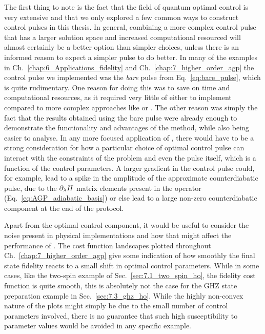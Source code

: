 The first thing to note is the fact that the field of quantum optimal control is very extensive and that we only explored a few common ways to construct control pulses in this thesis. In general, combining a more complex control pulse that has a larger solution space and increased computational resourced will almost certainly be a better option than simpler choices, unless there is an informed reason to expect a simpler pulse to do better. In many of the examples in Ch.~\ref{chap:6_Applications_fidelity} and Ch.~\ref{chap:7_higher_order_agp} the control pulse we implemented was the \emph{bare} pulse from Eq.~\eqref{eq:bare_pulse}, which is quite rudimentary. One reason for doing this was to save on time and computational resources, as it required very little of either to implement compared to more complex approaches like  or . The other reason was simply the fact that the results obtained using the bare pulse were already enough to demonstrate the functionality and advantages of the method, while also being easier to analyse. In any more focused application of , there would have to be a strong consideration for how a particular choice of optimal control pulse can interact with the constraints of the problem and even the  pulse itself, which is a function of the control parameters. A larger gradient in the control pulse could, for example, lead to a spike in the amplitude of the approximate counterdiabatic pulse, due to the $\partial_{\lambda} H$ matrix elements present in the  operator (Eq.~\eqref{eq:AGP_adiabatic_basis}) or else lead to a large non-zero counterdiabatic component at the end of the protocol. 

Apart from the optimal control component, it would be useful to consider the noise present in physical implementations and how that might affect the performance of . The cost function landscapes plotted throughout Ch.~\ref{chap:7_higher_order_agp} give some indication of how smoothly the final state fidelity reacts to a small shift in optimal control parameters. While in some cases, like the two-spin example of Sec.~\ref{sec:7.1_two_spin_ho}, the fidelity cost function is quite smooth, this is absolutely not the case for the GHZ state preparation example in Sec.~\ref{sec:7.3_ghz_ho}. While the highly non-convex nature of the plots might simply be due to the small number of control parameters involved, there is no guarantee that such high susceptibility to parameter values would be avoided in any specific example.


